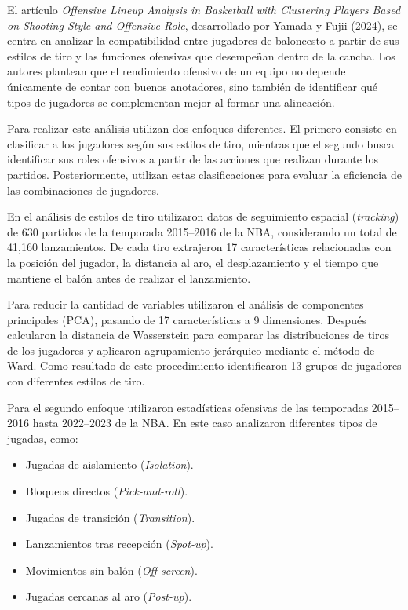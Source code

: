 El artículo \textit{Offensive Lineup Analysis in Basketball with Clustering Players Based on Shooting Style and Offensive Role}, desarrollado por Yamada y Fujii (2024), se centra en analizar la compatibilidad entre jugadores de baloncesto a partir de sus estilos de tiro y las funciones ofensivas que desempeñan dentro de la cancha. Los autores plantean que el rendimiento ofensivo de un equipo no depende únicamente de contar con buenos anotadores, sino también de identificar qué tipos de jugadores se complementan mejor al formar una alineación.

Para realizar este análisis utilizan dos enfoques diferentes. El primero consiste en clasificar a los jugadores según sus estilos de tiro, mientras que el segundo busca identificar sus roles ofensivos a partir de las acciones que realizan durante los partidos. Posteriormente, utilizan estas clasificaciones para evaluar la eficiencia de las combinaciones de jugadores.

En el análisis de estilos de tiro utilizaron datos de seguimiento espacial (\textit{tracking}) de 630 partidos de la temporada 2015--2016 de la NBA, considerando un total de 41,160 lanzamientos. De cada tiro extrajeron 17 características relacionadas con la posición del jugador, la distancia al aro, el desplazamiento y el tiempo que mantiene el balón antes de realizar el lanzamiento.

Para reducir la cantidad de variables utilizaron el análisis de componentes principales (PCA), pasando de 17 características a 9 dimensiones. Después calcularon la distancia de Wasserstein para comparar las distribuciones de tiros de los jugadores y aplicaron agrupamiento jerárquico mediante el método de Ward. Como resultado de este procedimiento identificaron 13 grupos de jugadores con diferentes estilos de tiro.

Para el segundo enfoque utilizaron estadísticas ofensivas de las temporadas 2015--2016 hasta 2022--2023 de la NBA. En este caso analizaron diferentes tipos de jugadas, como:

\begin{itemize}
    \item Jugadas de aislamiento (\textit{Isolation}).
    \item Bloqueos directos (\textit{Pick-and-roll}).
    \item Jugadas de transición (\textit{Transition}).
    \item Lanzamientos tras recepción (\textit{Spot-up}).
    \item Movimientos sin balón (\textit{Off-screen}).
    \item Jugadas cercanas al aro (\textit{Post-up}).
\end{itemize}

